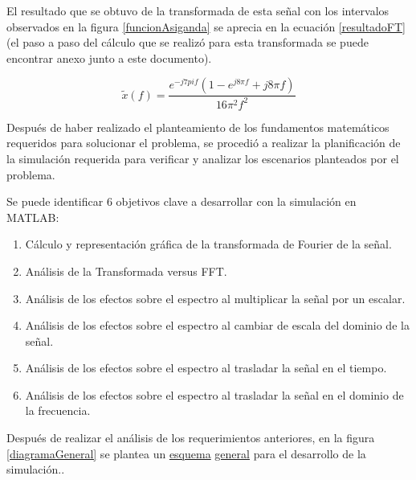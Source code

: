 \documentclass[11pt,letterpaper,twocolumn]{article}
\begin{document}
    El resultado que se obtuvo de la transformada de esta señal con los intervalos observados en la
    figura \ref{funcionAsiganda} se aprecia en la ecuación \ref{resultadoFT} (el paso a paso del cálculo que se 
    realizó para esta transformada se puede encontrar anexo junto a este documento).
    
    \begin{equation}
        \tilde{x}(f) = \frac{e^{-j7pi f }(1 - e^{j8\pi f} + j8\pi f)}{16\pi^2 f^2}
        \label{resultadoFT}
    \end{equation} 
   
    Después de haber realizado el planteamiento de los fundamentos matemáticos requeridos para solucionar
    el problema, se procedió a realizar la planificación de la simulación requerida para verificar y analizar
    los escenarios planteados por el problema. 
    
    Se puede identificar 6 objetivos clave a desarrollar con la simulación en MATLAB:
    
    \begin{enumerate}
        \item Cálculo y representación gráfica de la transformada de Fourier de la señal.
        \item Análisis de la Transformada versus FFT. 
        \item Análisis de los efectos sobre el espectro al multiplicar la señal por un escalar.
        \item Análisis de los efectos sobre el espectro al cambiar de escala del dominio de la señal.
        \item Análisis de los efectos sobre el espectro al trasladar la señal en el tiempo.
        \item Análisis de los efectos sobre el espectro al trasladar la señal en el dominio de la frecuencia.
    \end{enumerate}
    
    Después de realizar el análisis de los requerimientos anteriores, en la figura \ref{diagramaGeneral}
    se plantea un \underline{esquema} \underline{general} para el desarrollo de la simulación..
    
\end{document}

